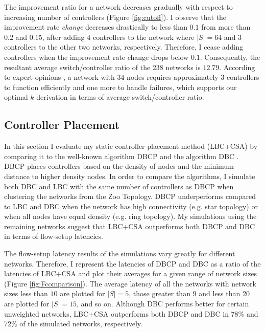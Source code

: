 \documentclass[journal]{IEEEtran}
\begin{document}
The improvement ratio for a network decreases gradually with respect to increasing number of controllers (Figure \ref{fig:cutoff}). I observe that the improvement rate \textit{change} decreases drastically to less than $0.1$ from more than $0.2$ and $0.15$, after adding 4 controllers to the network where $|S|=64$ and 3 controllers to the other two networks, respectively. Therefore, I cease adding controllers when the improvement rate change drops below $0.1$. Consequently, the resultant average switch/controller ratio of the 238 networks is $12.79$. According to expert opinions \cite{cpp2012heller}, a network with $34$ nodes requires approximately $3$ controllers to function efficiently and one more to handle failures, which supports our optimal $k$ derivation in terms of average switch/controller ratio.

\subsection{Controller Placement} \label{CPAnalysis}
In this section I evaluate my static controller placement method (LBC+CSA) by comparing it to the well-known algorithm DBCP \cite{dbcp2017} and the algorithm DBC \cite{aziz2019degree}. DBCP places controllers based on the density of nodes and the minimum distance to higher density nodes. In order to compare the algorithms, I simulate both DBC and LBC with the same number of controllers as DBCP when clustering the networks from the Zoo Topology. DBCP underperforms compared to LBC and DBC when the network has high connectivity (e.g. star topology) or when all nodes have equal density (e.g. ring topology). My simulations using the remaining networks suggest that LBC+CSA outperforms both DBCP and DBC in terms of flow-setup latencies.

The flow-setup latency results of the simulations vary greatly for different networks. Therefore, I represent the latencies of DBCP and DBC as a ratio of the latencies of LBC+CSA and plot their averages for a given range of network sizes (Figure \ref{fig:Fcomparison}). The average latency of all the networks with network sizes less than $10$ are plotted for $|S|=5$, those greater than 9 and less than 20 are plotted for $|S|=15$, and so on. Although DBC performs better for certain unweighted networks, LBC+CSA outperforms both DBCP and DBC in 78\% and 72\% of the simulated networks, respectively.
\end{document}
